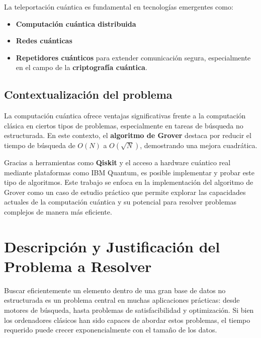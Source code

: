 \documentclass{article}
\begin{document}
La teleportación cuántica es fundamental en tecnologías emergentes como:

\begin{itemize}
    \item \textbf{Computación cuántica distribuida}
    \item \textbf{Redes cuánticas}
    \item \textbf{Repetidores cuánticos} para extender comunicación segura, especialmente en el campo de la \textbf{criptografía cuántica}.
\end{itemize}


\subsection{Contextualización del problema}

La computación cuántica ofrece ventajas significativas frente a la computación clásica en ciertos tipos de problemas, especialmente en tareas de búsqueda no estructurada. En este contexto, el \textbf{algoritmo de Grover} destaca por reducir el tiempo de búsqueda de $O(N)$ a $O(\sqrt{N})$, demostrando una mejora cuadrática.

Gracias a herramientas como \textbf{Qiskit} y el acceso a hardware cuántico real mediante plataformas como IBM Quantum, es posible implementar y probar este tipo de algoritmos. Este trabajo se enfoca en la implementación del algoritmo de Grover como un caso de estudio práctico que permite explorar las capacidades actuales de la computación cuántica y su potencial para resolver problemas complejos de manera más eficiente.



\section{Descripción y Justificación del Problema a Resolver}\label{sec:descr}

Buscar eficientemente un elemento dentro de una gran base de datos no estructurada es un problema central en muchas aplicaciones prácticas: desde motores de búsqueda, hasta problemas de satisfacibilidad y optimización. Si bien los ordenadores clásicos han sido capaces de abordar estos problemas, el tiempo requerido puede crecer exponencialmente con el tamaño de los datos.
\end{document}
